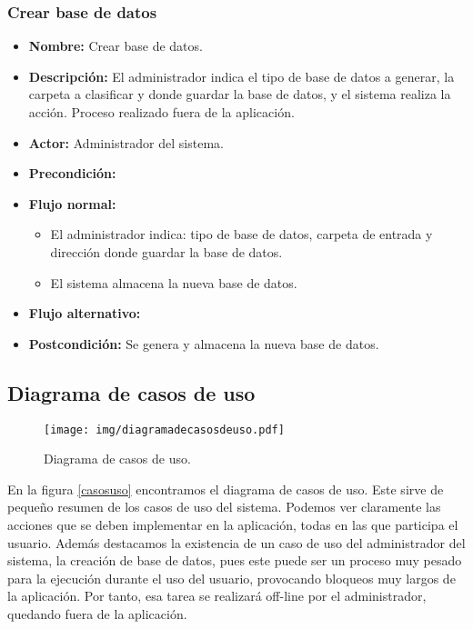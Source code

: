 \subsubsection{Crear base de datos}

\begin{itemize}
\item \textbf{Nombre: }Crear base de datos.
\item \textbf{Descripción: }El administrador indica el tipo de base de datos a generar, la carpeta a clasificar y donde guardar la base de datos, y el sistema realiza la acción. Proceso realizado fuera de la aplicación.
\item \textbf{Actor: }Administrador del sistema.
\item \textbf{Precondición: }
\item \textbf{Flujo normal: }
\begin{itemize}
\item El administrador indica: tipo de base de datos, carpeta de entrada y dirección donde guardar la base de datos.
\item El sistema almacena la nueva base de datos.
\end{itemize}
\item \textbf{Flujo alternativo:}
\item \textbf{Postcondición: } Se genera y almacena la nueva base de datos.
\end{itemize}

\subsection{Diagrama de casos de uso}
\begin{figure}[H]
\begin{center}

\texttt{[image: img/diagramadecasosdeuso.pdf]}
\end{center}

\caption{Diagrama de casos de uso.}
\label{casouso}
\end{figure}

En la figura \ref{casosuso} encontramos el diagrama de casos de uso. Este sirve de pequeño resumen de los casos de uso del sistema. Podemos ver claramente las acciones que se deben implementar en la aplicación, todas en las que participa el usuario. Además destacamos la existencia de un caso de uso del administrador del sistema, la creación de base de datos, pues este puede ser un proceso muy pesado para la ejecución durante el uso del usuario, provocando bloqueos muy largos de la aplicación. Por tanto, esa tarea se realizará off-line por el administrador, quedando fuera de la aplicación.\\

